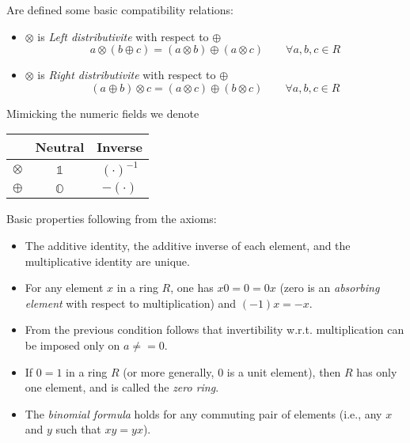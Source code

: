 \documentclass[a4paper,12pt]{scrartcl}    %
\newcommand{\OpA}{\otimes}
\newcommand{\OpB}{\oplus}
\begin{document}
\begin{landscape}
\begin{minipage}[c][\textheight]{0.30 \linewidth}
		Are defined some basic compatibility relations:
		\begin{itemize}
		\item $\OpA$ is \emph{Left distributivite} with respect to $\OpB$
			\begin{equation}\label{LeftDistributivity}
				a \OpA ( b \OpB c) = (a \OpA b) \OpB (a \OpA c) \qquad \forall a,b,c \in R
			\end{equation}
		\item  $\OpA$ is \emph{Right distributivite} with respect to $\OpB$
			\begin{equation}\label{RightDistributivity}
				( a \OpB b)\OpA c = (a \OpA c) \OpB (b \OpA c) \qquad \forall a,b,c \in R	
			\end{equation}
		\end{itemize}
		\begin{notationfix}
			Mimicking the numeric fields we denote
			\begin{tabular}{|c|c c|}
				\hline 
					& Neutral & Inverse \\
				\hline
				$\OpA$ & $\mathbb{1}$ & $(\cdot)^{-1}$\\
				$\OpB$ & $\mathbb{O}$ & $-(\cdot)$\\
				\hline
			\end{tabular}
		\end{notationfix}
		
		Basic properties following from the axioms:
		\begin{itemize}
			\item The additive identity, the additive inverse of each element, and the multiplicative identity are unique.
			\item For any element $x$ in a ring $R$, one has $x 0 = 0 = 0x $ (zero is an \emph{absorbing element} with respect to multiplication) and $(-1)x = -x$.
			\item From the previous condition follows that invertibility w.r.t. multiplication can be imposed only on $a \neq =0$.
			\item If $0 = 1$ in a ring $R$ (or more generally, 0 is a unit element), then $R$ has only one element, and is called the \emph{zero ring}.
			\item The \emph{binomial formula} holds for any commuting pair of elements (i.e., any $x$ and $y$ such that $xy = yx$).
		\end{itemize}
		
		
		

\end{minipage}
\end{landscape}
\end{document}
